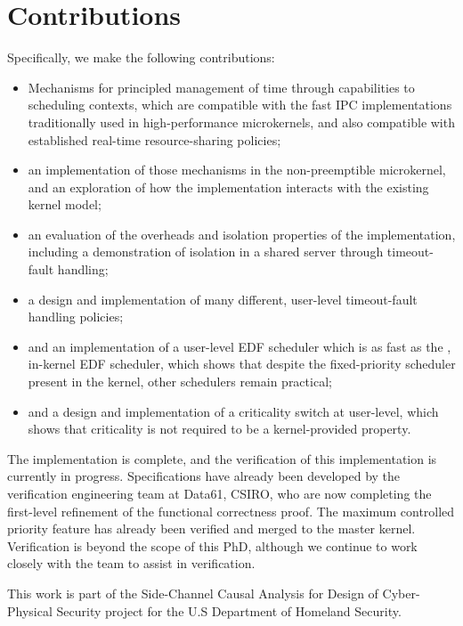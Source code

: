 \section{Contributions}

Specifically, we make the following contributions:

\begin{itemize}
    \item Mechanisms for principled management of time through capabilities to scheduling contexts,
        which are compatible with the fast IPC implementations traditionally used in high-performance
        microkernels, and also compatible with established real-time resource-sharing policies;
    \item an implementation of those mechanisms in the non-preemptible \selfour microkernel, and an
        exploration of how the implementation interacts with the existing kernel model;
    \item an evaluation of the overheads and isolation properties of the implementation, including
        a demonstration of isolation in a shared server through timeout-fault handling;
    \item a design and implementation of many different, user-level timeout-fault handling policies;
    \item and an implementation of a user-level \gls{EDF} scheduler which is as fast as the
        \litmus, in-kernel EDF scheduler, which shows that despite the fixed-priority scheduler
        present in the kernel, other schedulers remain practical;
    \item and a design and implementation of a criticality switch at user-level, which shows that
        criticality is not required to be a kernel-provided property.
\end{itemize}

The implementation is complete, and the verification of this implementation is currently in progress.
Specifications have already been developed by the verification engineering team at Data61, CSIRO,
who are now completing the first-level refinement of the functional correctness proof.
The maximum controlled priority feature has already been verified and merged to the master kernel. 
Verification is beyond the scope of this PhD, although we continue to work closely with
the team to assist in verification. 

This work is part of
the Side-Channel Causal Analysis for Design of Cyber-Physical Security project for the U.S
Department of Homeland Security.

